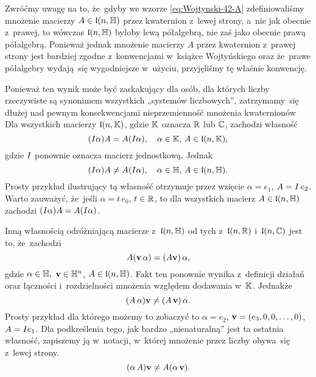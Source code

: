 \documentclass[a4paper,11pt]{article}
\begin{document}
Zwróćmy uwagę na to, że~gdyby we wzorze \eqref{eq:Wojtynski-42-A}
zdefiniowaliśmy mnożenie macierzy $A \in \mathfrak{l}( n, \mathbb{H} )$ przez kwaternion
z~lewej strony, a~nie jak obecnie z~prawej, to wówczas $\mathfrak{l}( n, \mathbb{H} )$ byłoby lewą półalgebrą, nie zaś jako obecnie prawą półalgebrą. Ponieważ jednak mnożenie macierzy $A$ przez kwaternion z~prawej strony jest bardziej zgodne z~konwencjami w~książce Wojtyńskiego oraz że~prawe półalgebry wydają~się wygodniejsze w~użyciu, przyjęliśmy tę właśnie konwencję.

Ponieważ ten wynik może być zaskakujący dla osób, dla których liczby
rzeczywiste są synonimem wszystkich „systemów liczbowych”, zatrzymamy~się
dłużej nad pewnym konsekwencjami nieprzemienność mnożenia kwaternionów Dla
wszystkich macierzy $\mathfrak{l}( n, \mathbb{K} )$, gdzie $\mathbb{K}$ oznacza $\mathbb{R}$ lub
$\mathbb{C}$, zachodzi własność
\begin{equation}
  \label{eq:Wojtynski-53}
  ( I \alpha ) A = A ( I \alpha ), \quad
  \alpha \in \mathbb{K}, \, A \in \mathfrak{l}( n, \mathbb{K} ),
\end{equation}
gdzie $I$ ponownie oznacza macierz jednostkową. Jednak
\begin{equation}
  \label{eq:Wojtynski-54}
  ( I \alpha ) A \neq A ( I \alpha ), \quad
  \alpha \in \mathbb{H}, \, A \in \mathfrak{l}( n, \mathbb{H} ).
\end{equation}
Prosty przykład ilustrujący tą własność otrzymuje przez wzięcie
$\alpha = e_{ 1 }$, $A = I \, e_{ 2 }$. Warto zauważyć, że~jeśli
$\alpha = t \, e_{ 0 }$, $t \in \mathbb{R}$, to dla wszystkich macierz
$A \in \mathfrak{l}( n, \mathbb{H} )$ zachodzi $( I \alpha ) A = A ( I \alpha )$.

Inną własnością odróżniającą macierze z~$\mathfrak{l}( n, \mathbb{H} )$ od tych
z~$\mathfrak{l}( n, \mathbb{R} )$ i~$\mathfrak{l}( n, \mathbb{C} )$ jest to,
że~zachodzi
\begin{equation}
  \label{eq:Wojtynski-55}
  A ( \mathbf{v} \, \alpha ) = ( A \mathbf{v} ) \, \alpha,
\end{equation}
gdzie $\alpha \in \mathbb{H},$ $\mathbf{v} \in \mathbb{H}^{ n }$, $A \in \mathfrak{l}( n, \mathbb{H} )$. Fakt
ten ponownie wynika z~definicji działań oraz łączności i~rozdzielności
mnożenia
względem dodawania w~$\mathbb{K}$. Jednakże
\begin{equation}
  \label{eq:Wojtynski-56}
  ( A \, \alpha ) \mathbf{v} \neq ( A \, \mathbf{v} ) \, \alpha.
\end{equation}
Prosty przykład dla którego możemy to zobaczyć to $\alpha = e_{ 2 }$,
$\mathbf{v} = ( e_{ 3 }, 0, 0, \ldots, 0 )$, $A = I e_{ 1 }$. Dla
podkreślenia tego,
jak bardzo „nienaturalną” jest ta ostatnia własność, zapiszemy ją
w~notacji, w~której mnożenie przez liczby obywa~się z~lewej strony.
\begin{equation}
  \label{eq:Wojtynski-57}
  ( \alpha \, A ) \mathbf{v} \neq A ( \alpha \, \mathbf{v} ).
\end{equation}
\end{document}
